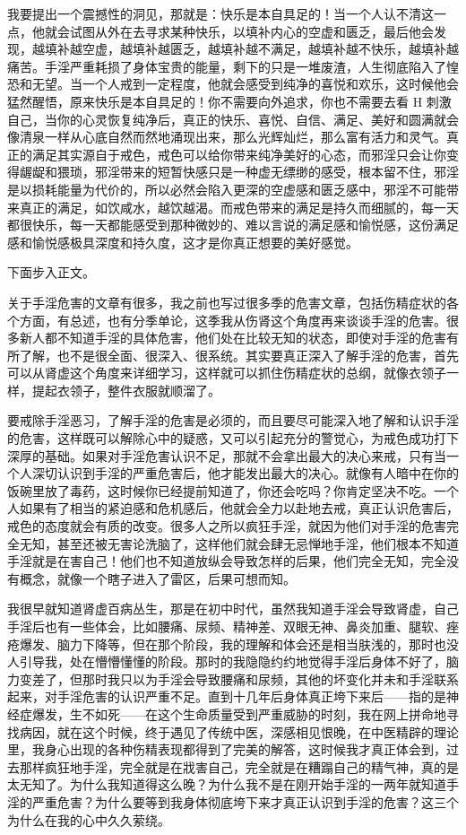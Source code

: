 \begin{case}
    我要提出一个震撼性的洞见，那就是：快乐是本自具足的！当一个人认不清这一点，他就会试图从外在去寻求某种快乐，以填补内心的空虚和匮乏，最后他会发现，越填补越空虚，越填补越匮乏，越填补越不满足，越填补越不快乐，越填补越痛苦。手淫严重耗损了身体宝贵的能量，剩下的只是一堆废渣，人生彻底陷入了惶恐和无望。当一个人戒到一定程度，他就会感受到纯净的喜悦和欢乐，这时候他会猛然醒悟，原来快乐是本自具足的！你不需要向外追求，你也不需要去看 H 刺激自己，当你的心灵恢复纯净后，真正的快乐、喜悦、自信、满足、美好和圆满就会像清泉一样从心底自然而然地涌现出来，那么光辉灿烂，那么富有活力和灵气。真正的满足其实源自于戒色，戒色可以给你带来纯净美好的心态，而邪淫只会让你变得龌龊和猥琐，邪淫带来的短暂快感只是一种虚无缥缈的感受，根本留不住，邪淫是以损耗能量为代价的，所以必然会陷入更深的空虚感和匮乏感中，邪淫不可能带来真正的满足，如饮咸水，越饮越渴。而戒色带来的满足是持久而细腻的，每一天都很快乐，每一天都能感受到那种微妙的、难以言说的满足感和愉悦感，这份满足感和愉悦感极具深度和持久度，这才是你真正想要的美好感觉。
\end{case}

下面步入正文。

关于手淫危害的文章有很多，我之前也写过很多季的危害文章，包括伤精症状的各个方面，有总述，也有分季单论，这季我从伤肾这个角度再来谈谈手淫的危害。很多新人都不知道手淫的具体危害，他们处在比较无知的状态，即使对手淫的危害有所了解，也不是很全面、很深入、很系统。其实要真正深入了解手淫的危害，首先可以从肾虚这个角度来详细学习，这样就可以抓住伤精症状的总纲，就像衣领子一样，提起衣领子，整件衣服就顺溜了。

要戒除手淫恶习，了解手淫的危害是必须的，而且要尽可能深入地了解和认识手淫的危害，这样既可以解除心中的疑惑，又可以引起充分的警觉心，为戒色成功打下深厚的基础。如果对手淫危害认识不足，那就不会拿出最大的决心来戒，只有当一个人深切认识到手淫的严重危害后，他才能发出最大的决心。就像有人暗中在你的饭碗里放了毒药，这时候你已经提前知道了，你还会吃吗？你肯定坚决不吃。一个人如果有了相当的紧迫感和危机感后，他就会全力以赴地去戒，真正认识危害后，戒色的态度就会有质的改变。很多人之所以疯狂手淫，就因为他们对手淫的危害完全无知，甚至还被无害论洗脑了，这样他们就会肆无忌惮地手淫，他们根本不知道手淫就是在害自己！他们也不知道放纵会导致怎样的后果，他们完全无知，完全没有概念，就像一个瞎子进入了雷区，后果可想而知。

我很早就知道肾虚百病丛生，那是在初中时代，虽然我知道手淫会导致肾虚，自己手淫后也有一些体会，比如腰痛、尿频、精神差、双眼无神、鼻炎加重、腿软、痤疮爆发、脑力下降等，但在那个阶段，我的理解和体会还是相当肤浅的，那时也没人引导我，处在懵懵懂懂的阶段。那时的我隐隐约约地觉得手淫后身体不好了，脑力变差了，但那时我只以为手淫会导致腰痛和尿频，其他的坏变化并未和手淫联系起来，对手淫危害的认识严重不足。直到十几年后身体真正垮下来后——指的是神经症爆发，生不如死——在这个生命质量受到严重威胁的时刻，我在网上拼命地寻找病因，就在这个时候，终于遇见了传统中医，深感相见恨晚，在中医精辟的理论里，我身心出现的各种伤精表现都得到了完美的解答，这时候我才真正体会到，过去那样疯狂地手淫，完全就是在戕害自己，完全就是在糟蹋自己的精气神，真的是太无知了。为什么我知道得这么晚？为什么我不是在刚开始手淫的一两年就知道手淫的严重危害？为什么要等到我身体彻底垮下来才真正认识到手淫的危害？这三个为什么在我的心中久久萦绕。

